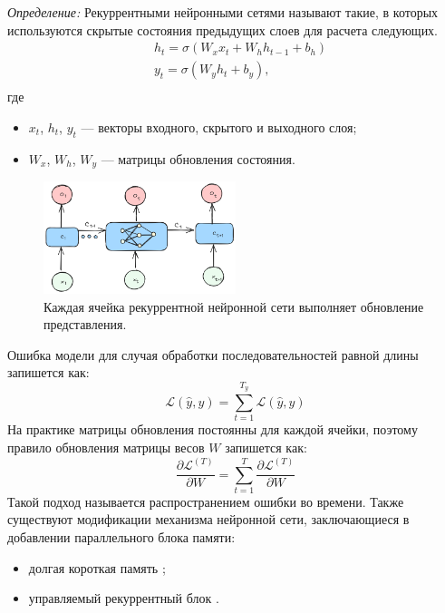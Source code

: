 \textit{Определение:} Рекуррентными нейронными сетями называют такие, в которых используются скрытые состояния 
предыдущих слоев для расчета следующих.
\begin{equation}
    \begin{aligned}
        & h_t = \sigma (W_x x_t + W_h h_{t-1}+ b_h) \\
        & y_t = \sigma (W_y h_t + b_y), \\
    \end{aligned}
\end{equation}
где \begin{itemize}
    \item $x_t$, $h_t$, $y_t$ --- векторы входного, скрытого и выходного слоя;
    \item $W_x$, $W_h$, $W_y$ --- матрицы обновления состояния.
\end{itemize}
\begin{figure}[h]
    \centering
    \includegraphics[width=0.5\textwidth]{assets/ml/nn/rnn.excalidraw.png}
    \caption{Каждая ячейка рекуррентной нейронной сети выполняет обновление представления.}
    \label{reccurent}
\end{figure}
Ошибка модели для случая обработки последовательностей равной длины запишется как:
\begin{equation}
    \mathcal{L}(\hat{y},y) = \sum_{t=1}^{T_y} \mathcal{L}(\hat{y},y)
\end{equation}
На практике матрицы обновления постоянны для каждой ячейки, поэтому правило обновления матрицы весов $W$ запишется как:
\begin{equation}
    \frac{\partial \mathcal{L}^{(T)}}{\partial W} = \sum_{t=1}^T \frac{\partial \mathcal{L}^{(T)} }{\partial W}
\end{equation}
Такой подход называется распространением ошибки во времени. Также существуют модификации механизма нейронной сети,
заключающиеся в добавлении параллельного блока памяти:
\begin{itemize}
    \item долгая короткая память \cite{ochreiter1997long};
    \item управляемый рекуррентный блок \cite{chung2014empirical}.
\end{itemize}

